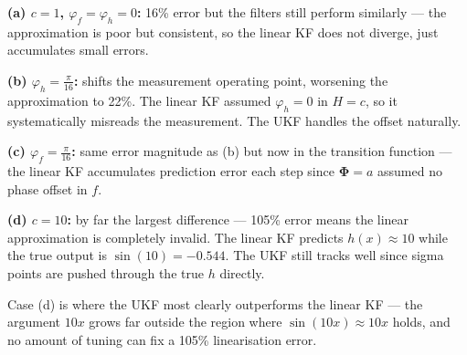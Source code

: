 \documentclass[12pt, a4paper]{article}
\begin{document}
\textbf{(a) $c=1$, $\varphi_f = \varphi_h = 0$:} 16\% error but the filters
still perform similarly --- the approximation is poor but consistent, so the
linear KF does not diverge, just accumulates small errors.

\textbf{(b) $\varphi_h = \frac{\pi}{16}$:} shifts the measurement operating
point, worsening the approximation to 22\%. The linear KF assumed $\varphi_h = 0$
in $H = c$, so it systematically misreads the measurement. The UKF handles
the offset naturally.

\textbf{(c) $\varphi_f = \frac{\pi}{16}$:} same error magnitude as (b) but
now in the transition function --- the linear KF accumulates prediction error
each step since $\boldsymbol{\Phi} = a$ assumed no phase offset in $f$.

\textbf{(d) $c = 10$:} by far the largest difference --- 105\% error means
the linear approximation is completely invalid. The linear KF predicts $h(x)
\approx 10$ while the true output is $\sin(10) = -0.544$. The UKF still
tracks well since sigma points are pushed through the true $h$ directly.

\begin{notebox}
  Case (d) is where the UKF most clearly outperforms the linear KF ---
  the argument $10x$ grows far outside the region where $\sin(10x) \approx 10x$
  holds, and no amount of tuning can fix a 105\% linearisation error.
\end{notebox}
\end{document}
